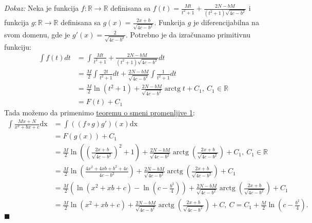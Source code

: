 \documentclass{article}
\DeclareMathOperator{\arctg}{arctg}
\begin{document}
\textit{Dokaz:} Neka je funkcija $ f:\mathbb{R}\longrightarrow\mathbb{R}$ definisana sa
$\displaystyle f\left(t\right)=\frac{Mt}{t^2+1}+\frac{2N-bM}{\left(t^2+1\right)\sqrt{4c-b^2}}$ i funkcija $g:\mathbb{R}\longrightarrow\mathbb{R}$
definisana sa $\displaystyle g\left(x\right)=\frac{2x+b}{\sqrt{4c-b^2}}$. Funkcija $g$ je diferencijabilna na svom domenu, gde je $\displaystyle g'\left(x\right)=\frac{2}{\sqrt{4c-b^2}}$.
Potrebno je da izračunamo primitivnu funkciju:
\begin{align*}
    \int f\left(t\right)dt & =\int \frac{Mt}{t^2+1}+\frac{2N-bM}{\left(t^2+1\right)\sqrt{4c-b^2}}dt                        \\
                           & =\frac{M}{2}\int \frac{2t}{t^2+1}dt+\frac{2N-bM}{\sqrt{4c-b^2}}\int\frac{1}{t^2+1}dt          \\
                           & =\frac{M}{2}\ln\left(t^2+1\right)+\frac{2N-bM}{\sqrt{4c-b^2}}\arctg{t}+C_1,\ C_1\in\mathbb{R} \\
                           & =F\left(t\right)+C_1
\end{align*}
Tada možemo da primenimo \hyperref[teorema_1.2]{teoremu o smeni promenljive 1}:
\begin{align*}
    \int \frac{Mx+N}{x^2+bx+c}\text{dx} & = \int \left(\left(f\circ g\right) g'\right)\left(x\right)\text{dx}                                                                                                         \\
                                        & = F\left(g\left(x\right)\right) + C_1                                                                                                                                       \\
                                        & = \frac{M}{2}\ln\left(\left(\frac{2x+b}{\sqrt{4c-b^2}}\right)^2+1\right)+\frac{2N-bM}{\sqrt{4c-b^2}}\arctg\left({\frac{2x+b}{\sqrt{4c-b^2}}}\right)+ C_1,\ C_1\in\mathbb{R} \\
                                        & = \frac{M}{2}\ln\left(\frac{4x^2+4xb+b^2+4c}{4c-b^2}\right)+\frac{2N-bM}{\sqrt{4c-b^2}}\arctg\left({\frac{2x+b}{\sqrt{4c-b^2}}}\right)+ C_1                                 \\
                                        & = \frac{M}{2}\left(\ln\left(x^2+xb+c\right)-\ln\left(c-\frac{b^2}{4}\right)\right)+\frac{2N-bM}{\sqrt{4c-b^2}}\arctg\left({\frac{2x+b}{\sqrt{4c-b^2}}}\right)+ C_1          \\
                                        & = \frac{M}{2}\ln\left(x^2+xb+c\right)+\frac{2N-bM}{\sqrt{4c-b^2}}\arctg\left({\frac{2x+b}{\sqrt{4c-b^2}}}\right)+ C,\ C=C_1+ \frac{M}{2}\ln\left(c-\frac{b^2}{4}\right).
\end{align*}
\null\hfill $\blacksquare$\par
\end{document}
